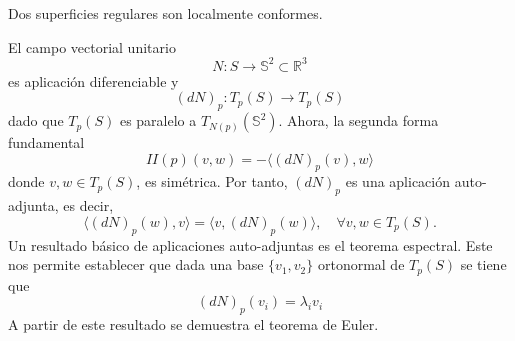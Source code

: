 \begin{theo}
  Dos superficies regulares son localmente conformes.
\end{theo}

\begin{note}
  El campo vectorial unitario
  \[
    N : S \to \mathbb{S}^{2} \subset \mathbb{R}^{3}
  \]
  es aplicación diferenciable y
  \[
    (dN)_{p} : T_{p}(S) \to T_{p}(S)
  \]
  dado que $T_{p}(S)$ es paralelo a $T_{N(p)}(\mathbb{S}^{2})$. Ahora, la segunda forma fundamental
  \[ 
    II(p)(v, w) = - \langle (d N)_{p}(v){ , }w \rangle 
  \] 
  donde $v, w \in T_{p}(S)$, es simétrica. Por tanto, $(dN)_{p}$ es una aplicación auto-adjunta, es decir, 
  \[ 
    \langle (d N)_{p}(w){ , }v \rangle = \langle v{ , }(d N)_{p}(w) \rangle, \quad \forall v, w \in T_{p}(S).
  \] 
  Un resultado básico de aplicaciones auto-adjuntas es el teorema espectral. Este nos permite establecer que dada una base $\{ v_{1}, v_{2} \}$ ortonormal de $T_{p}(S)$ se tiene que
  \[ 
    (d N)_{p}(v_{i}) = \lambda_{i} v_{i} 
  \] 
  A partir de este resultado se demuestra el teorema de Euler.
\end{note}
